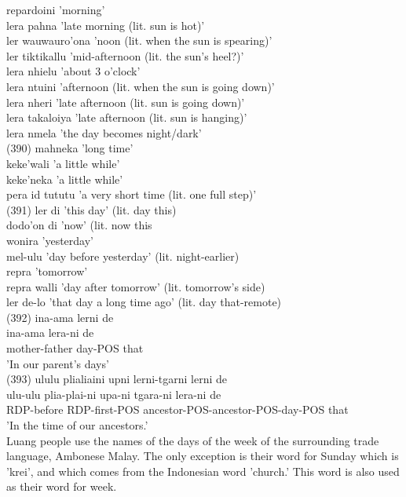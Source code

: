 \documentclass[10pt]{article}
\begin{document}
repardoini 'morning'\\
lera pahna 'late morning (lit. sun is hot)'\\
ler wauwauro'ona 'noon (lit. when the sun is spearing)'\\
ler tiktikallu 'mid-afternoon (lit. the sun's heel?)'\\
lera nhielu 'about 3 o'clock'\\
lera ntuini 'afternoon (lit. when the sun is going down)'\\
lera nheri 'late afternoon (lit. sun is going down)'\\
lera takaloiya 'late afternoon (lit. sun is hanging)'\\
lera nmela 'the day becomes night/dark'\\
(390) mahneka 'long time'\\
keke'wali 'a little while'\\
keke'neka 'a little while'\\
pera id tututu 'a very short time (lit. one full step)'\\
(391) ler di 'this day' (lit. day this)\\
dodo'on di 'now' (lit. now this\\
wonira 'yesterday'\\
mel-ulu 'day before yesterday' (lit. night-earlier)\\
repra 'tomorrow'\\
repra walli 'day after tomorrow' (lit. tomorrow's side)\\
ler de-lo 'that day a long time ago' (lit. day that-remote)\\
(392) ina-ama lerni de\\
ina-ama lera-ni de\\
mother-father day-POS that\\
'In our parent's days'\\
(393) ululu plialiaini upni lerni-tgarni lerni de\\
ulu-ulu plia-plai-ni upa-ni tgara-ni lera-ni de\\
RDP-before RDP-first-POS ancestor-POS-ancestor-POS-day-POS that\\
'In the time of our ancestors.'\\
Luang people use the names of the days of the week of the surrounding trade language, Ambonese Malay. The only exception is their word for Sunday which is 'krei', and which comes from the Indonesian word 'church.' This word is also used as their word for week.
\end{document}
